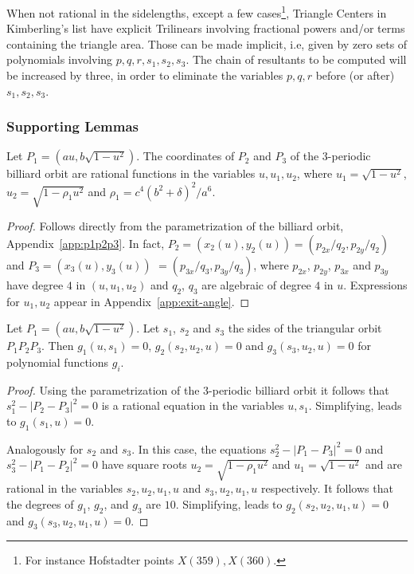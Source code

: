 When not rational in the sidelengths, except a few cases\footnote{For instance Hofstadter points $X(359), X(360)$.}, Triangle Centers
in Kimberling's list have explicit Trilinears involving fractional powers and/or terms containing the triangle area. Those can be made implicit, i.e,
given by zero sets of polynomials involving $p,q,r, s_1, s_2, s_3$.  The chain of resultants to be computed will be increased by three, in order to eliminate the variables $p,q, r$ before (or after) $s_1, s_2, s_3$.

\subsubsection{Supporting Lemmas}
\label{sec:supporting-lemmas}

\begin{lemma}
\label{lem:1coord}
Let $P_1=({a}{u},b\sqrt{1-u^2}).$
	The coordinates of $P_2$ and $P_3$ of the 3-periodic billiard orbit are rational functions in the variables $u, u_1, u_2$, where
	$u_1=\sqrt{1-u^2}$, $u_2=\sqrt{1-\rho_1 u^2}$ 
and
	$\rho_1=c^4(b^2+\delta)^2/a^6$. %
		
	\end{lemma}
	
	\begin{proof}
	Follows directly from the parametrization of the billiard orbit, Appendix~\ref{app:p1p2p3}. In fact,  $P_2=(x_2(u),y_2(u)) =( p_{2x}/q_2, p_{2y}/q_2)$ and $P_3=(x_3(u),y_3(u))$ $=( p_{3x}/q_3, p_{3y}/q_3)$, where $p_{2x}$, $p_{2y}$, $p_{3x}$ and $p_{3y}$ have degree $4$ in $(u,u_1,u_2)$  and $q_2$, $q_3$ are algebraic of degree $4$ in $u$. Expressions for $u_1,u_2$ appear in Appendix~\ref{app:exit-angle}.
\end{proof}
	
\begin{lemma}
\label{lem:2sides} Let $P_1=(a u,b\sqrt{1-u^2}).$ Let $s_1$, $s_2$ and $s_3$ the sides of the triangular orbit ${P_1}{P_2}{P_3}$. Then $g_1(u,s_1)=0$, $g_2(s_2,u_2,u)=0$ and $g_3(s_3,u_2,u)=0$ for polynomial functions $g_i$.  
\end{lemma}
	
\begin{proof}
Using the parametrization of the 3-periodic billiard orbit it follows that $s_1^2-|P_2-P_3|^2=0$ is a rational equation in the variables $u,s_1$. Simplifying, leads to $g_1(s_1,u)=0.$

Analogously for $s_2$ and $s_3$. In this case, the equations $s_2^2-|P_1-P_3|^2=0$ and  $s_3^2-|P_1-P_2|^2=0$   have   square roots $u_2=\sqrt{1-\rho_1 u^2}$ and $u_1=\sqrt{1-u^2}$ and  are rational in the variables $s_2,u_2,u_1,u$ and $s_3,u_2,u_1,u$ respectively. It follows that the degrees of $g_1$, $g_2$, and $g_3$ are $10$.  Simplifying, leads to $g_2(s_2,u_2,u_1,u)=0 $ and $g_3(s_3,u_2,u_1,u)=0$. 
\end{proof}

